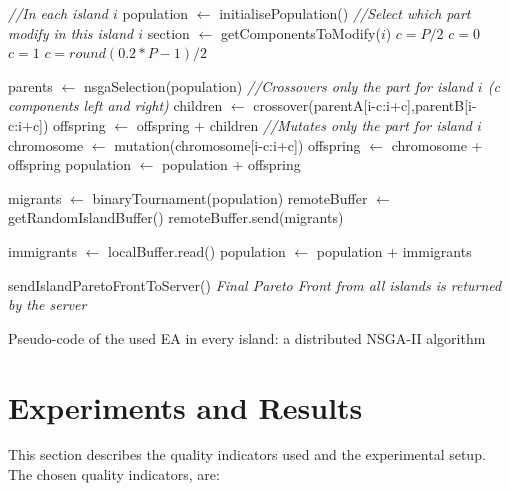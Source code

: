 \documentclass[preprint]{elsarticle}
\begin{document}
\begin{algorithm}[htb]

\begin{algorithmic}
\STATE \textit{//In each island $i$}
\STATE population $\gets$ initialisePopulation()
\STATE \textit{//Select which part modify in this island $i$}
\STATE section $\gets$ getComponentsToModify($i$)
	\STATE $c=P/2$
	\STATE $c=0$
	\STATE $c=1$
	\STATE $c=round(0.2*P-1)/2$
\ENDIF

    \STATE parents $\gets$ nsgaSelection(population)
    	\STATE \textit{//Crossovers only the part for island $i$ (c components left and right)}
    	\STATE children  $\gets$ crossover(parentA[i-c:i+c],parentB[i-c:i+c])
    	\STATE offspring $\gets$ offspring + children
    \ENDFOR
    		\STATE \textit{//Mutates only the part for island $i$}
    		\STATE chromosome $\gets$ mutation(chromosome[i-c:i+c])
    		\STATE offspring $\gets$ chromosome + offspring
    	\ENDIF
    \ENDFOR
    \STATE population $\gets$ population + offspring
    

      \STATE migrants $\gets$ binaryTournament(population)
      \STATE remoteBuffer $\gets$ getRandomIslandBuffer()
      \STATE remoteBuffer.send(migrants)
    \ENDIF

      \STATE immigrants $\gets$ localBuffer.read()
      \STATE population $\gets$ population + immigrants
    \ENDIF
\ENDWHILE

\STATE sendIslandParetoFrontToServer()
\STATE \textit{Final Pareto Front from all islands is returned by the server}
\end{algorithmic}

\caption{Pseudo-code of the used EA in every island: a distributed NSGA-II algorithm }
\label{alg:EA}
\end{algorithm}



%
\section{Experiments and Results}
\label{sec:res}

This section describes the quality indicators used and the experimental setup. The chosen quality indicators, are:
\end{document}

